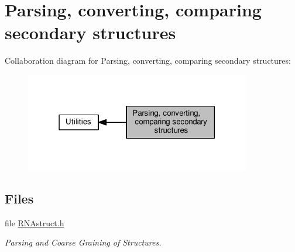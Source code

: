 \hypertarget{group__struct__utils}{}\section{Parsing, converting, comparing secondary structures}
\label{group__struct__utils}
Collaboration diagram for Parsing, converting, comparing secondary structures\+:
\nopagebreak
\begin{figure}[H]
\begin{center}
\leavevmode
\includegraphics[width=279pt]{group__struct__utils}
\end{center}
\end{figure}
\subsection*{Files}
\begin{DoxyCompactItemize}
\item 
file \hyperlink{RNAstruct_8h}{R\+N\+Astruct.\+h}
\begin{DoxyCompactList}\small\item\em Parsing and Coarse Graining of Structures. \end{DoxyCompactList}\end{DoxyCompactItemize}
